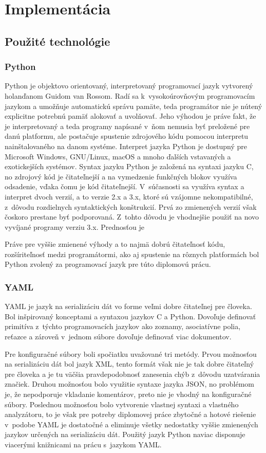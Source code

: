 \chapter{Implementácia}

\section{Použité technológie}
 \subsection{Python}
 Python \cite{B4mfUgNUpPnXbiEr} je objektovo orientovaný, interpretovaný programovací jazyk vytvorený holanďanom Guidom van Rossom. Radí sa k~vysokoúrovňovým programovacím jazykom a umožňuje automatickú správu pamäte, teda programátor nie je nútený explicitne potrebnú pamäť alokovať a uvolňovať. Jeho výhodou je práve fakt, že je interpretovaný a teda programy napísané v~ňom nemusia byť preložené pre danú platformu, ale postačuje spustenie zdrojového kódu pomocou interpretu nainštalovaného na danom systéme. Interpret jazyka Python je dostupný pre Microsoft Windows, GNU/Linux, macOS a mnoho ďalších vstavaných a exotickejších systémov. Syntax jazyku Python je založená na syntaxi jazyku C, no zdrojový kód je čitateľnejší a na vymedzenie funkčných blokov využíva odsadenie, vďaka čomu je kód čitateľnejší. V~súčasnosti sa využíva syntax a interpret dvoch verzií, a to verzie 2.x a 3.x, ktoré sú vzájomne nekompatibilné, z~dôvodu rozdielnych syntaktických konštrukcií. Prvá zo zmienených verzií však čoskoro prestane byť podporovaná. Z~tohto dôvodu je vhodnejšie použiť na novo vyvíjané programy verziu 3.x. Prednosťou je 
  
 Práve pre vyššie zmienené výhody a to najmä dobrú čitateľnosť kódu, rozšíriteľnosť  medzi programátormi, ako aj spustenie na rôznych platformách bol Python zvolený za programovací jazyk pre túto diplomovú prácu.
 \subsection{YAML}
 YAML \cite{Jd4UTaVyTULvXDoN} je jazyk na serializáciu dát vo forme veľmi dobre čitateľnej pre človeka. Bol inšpirovaný konceptami a syntaxou jazykov C a Python. Dovoľuje definovať primitíva z~týchto programovacích jazykov ako zoznamy, asociatívne polia, reťazce a zároveň v~jednom súbore dovoľuje definovať viac dokumentov.
 
 Pre konfiguračné súbory boli spočiatku uvažované tri metódy. Prvou možnosťou na serializáciu dát bol jazyk XML, tento formát však nie je tak dobre čitateľný pre človeka a je tu väčšia pravdepodobnosť zanesenia chýb z~dôvodu uzatvárania značiek. Druhou možnosťou bolo využitie syntaxe jazyka JSON, no problémom je, že nepodporuje vkladanie komentárov, preto nie je vhodný na konfiguračné súbory. Poslednou možnosťou bolo vytvorenie vlastnej syntaxi a vlastného analyzátoru, to je však pre potreby diplomovej práce zbytočné a hotové riešenie v~podobe YAML je dostatočné a eliminuje všetky nedostatky vyššie zmienených jazykov určených na serializáciu dát. Použitý jazyk Python naviac disponuje viacerými knižnicami na prácu s~jazykom YAML.  
